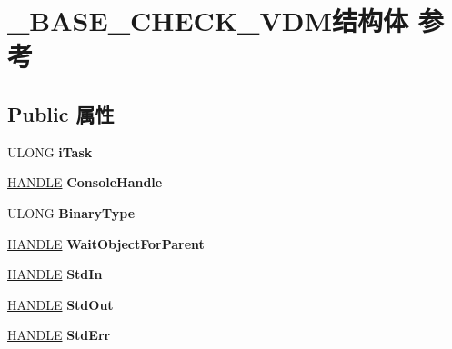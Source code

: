 \hypertarget{struct___b_a_s_e___c_h_e_c_k___v_d_m}{}\section{\+\_\+\+B\+A\+S\+E\+\_\+\+C\+H\+E\+C\+K\+\_\+\+V\+D\+M结构体 参考}
\label{struct___b_a_s_e___c_h_e_c_k___v_d_m}
\subsection*{Public 属性}
\begin{DoxyCompactItemize}
\item 
\mbox{\label{struct___b_a_s_e___c_h_e_c_k___v_d_m_ab26181d2367e4d131f6e3a5b8a1ac997}} 
U\+L\+O\+NG {\bfseries i\+Task}
\item 
\mbox{\label{struct___b_a_s_e___c_h_e_c_k___v_d_m_a766b4dc272de2d4fcdf31bebc6522c18}} 
\hyperlink{interfacevoid}{H\+A\+N\+D\+LE} {\bfseries Console\+Handle}
\item 
\mbox{\label{struct___b_a_s_e___c_h_e_c_k___v_d_m_ade8f9e423e9c35de1ad7705de61ea946}} 
U\+L\+O\+NG {\bfseries Binary\+Type}
\item 
\mbox{\label{struct___b_a_s_e___c_h_e_c_k___v_d_m_a35d2d77b16134f7fbda0de99488db571}} 
\hyperlink{interfacevoid}{H\+A\+N\+D\+LE} {\bfseries Wait\+Object\+For\+Parent}
\item 
\mbox{\label{struct___b_a_s_e___c_h_e_c_k___v_d_m_a9024168f776cd8cc11d33519fcc55788}} 
\hyperlink{interfacevoid}{H\+A\+N\+D\+LE} {\bfseries Std\+In}
\item 
\mbox{\label{struct___b_a_s_e___c_h_e_c_k___v_d_m_a35b9944c9b8514807c067d897bedd99e}} 
\hyperlink{interfacevoid}{H\+A\+N\+D\+LE} {\bfseries Std\+Out}
\item 
\mbox{\label{struct___b_a_s_e___c_h_e_c_k___v_d_m_a3ff33f5aee69f223654003e73150cb55}} 
\hyperlink{interfacevoid}{H\+A\+N\+D\+LE} {\bfseries Std\+Err}

\end{DoxyCompactItemize}
